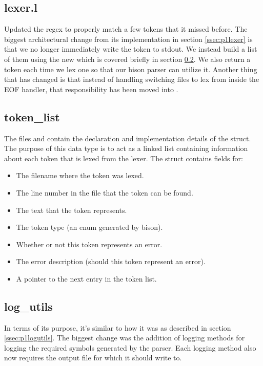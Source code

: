\documentclass{article}
\begin{document}
\subsection{lexer.l}
\label{ssec:p2lexer}
Updated the regex to properly match a few tokens that it missed before.
The biggest architectural change from its implementation in section \ref{ssec:p1lexer} is that we no longer immediately write the token to stdout.
We instead build a list of them using the new  which is covered briefly in section \ref{ssec:p2tokenlist}.
We also return a token each time we lex one so that our bison parser can utilize it.
Another thing that has changed is that instead of handling switching files to lex from inside the EOF handler, that responsibility has been moved into .

\subsection{token\_list}
\label{ssec:p2tokenlist}
The files  and  contain the declaration and implementation details of the  struct.
The purpose of this data type is to act as a linked list containing information about each token that is lexed from the lexer.
The struct contains fields for:
\begin{itemize}
    \item The filename where the token was lexed.
    \item The line number in the file that the token can be found.
    \item The text that the token represents.
    \item The token type (an enum generated by bison).
    \item Whether or not this token represents an error.
    \item The error description (should this token represent an error).
    \item A pointer to the next entry in the token list.
\end{itemize}

\subsection{log\_utils}
\label{ssec:p2logutils}
In terms of its purpose, it's similar to how it was as described in section \ref{ssec:p1logutils}.
The biggest change was the addition of logging methods for logging the required symbols generated by the parser.
Each logging method also now requires the output file for which it should write to.
\end{document}

